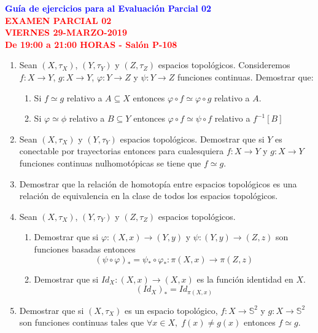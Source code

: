 \documentclass[12pt]{report}
\numberwithin{section}{chapter}
\newcommand{\s}{\mathbb S}
\begin{document}
\begin{center}
\textcolor{blue}{\textbf{\large Guía de ejercicios para al Evaluación Parcial 02}}\\
\vspace{0.5 cm}
\textcolor{red}{\textbf{\large EXAMEN PARCIAL 02 \\ VIERNES
29-MARZO-2019\\ De 19:00 a 21:00 HORAS - Salón P-108}}
\end{center}

\begin{enumerate}

\item Sean $(X,\tau_X)$, $(Y,\tau_Y)$ y $(Z, \tau_Z)$ espacios topológicos. Consideremos $f: X \to Y$, $g: X \to Y$, $\varphi: Y \to Z$ y $\psi: Y \to Z$ funciones continuas. Demostrar que:
\begin{enumerate}
\item Si $f \simeq g$ relativo a $A \subseteq X$ entonces $\varphi \circ f \simeq \varphi\circ g$ relativo a $A$.
\item Si $\varphi \simeq \phi$ relativo a $B\subseteq Y$ entonces $\varphi \circ f \simeq \psi \circ f$ relativo a $f^{-1}[B]$
\end{enumerate}

\item Sean $(X,\tau_X)$ y $(Y,\tau_Y)$ espacios topológicos. Demostrar que si $Y$ es conectable por trayectorias entonces para cualesquiera $f: X \to Y$ y $g : X\to Y$ funciones continuas nulhomotópicas se tiene que $f\simeq g$.

\item Demostrar que la relación de homotopía entre espacios topológicos es una relación de equivalencia en la clase de todos los espacios topológicos.

\item Sean $(X,\tau_X)$, $(Y,\tau_Y)$ y $(Z, \tau_Z)$ espacios topológicos.
\begin{enumerate}
\item Demostrar que si $\varphi: (X,x) \to (Y,y)$ y $\psi: (Y,y) \to (Z,z)$ son funciones basadas entonces
$$(\psi \circ \varphi)_* = \psi_*\circ \varphi_* : \pi(X,x)\to \pi(Z,z)$$

\item Demostrar que si $Id_X: (X,x)\to (X,x)$ es la función identidad en $X$.
$$(Id_X)_* = Id_{\pi(X,x)}$$
\end{enumerate}

\item Demostrar que si $(X, \tau_X)$ es un espacio topológico, $f : X \to \s^2$ y $g :X \to \s^2$ son funciones continuas tales que $\forall x\in X,\; f(x)\neq g(x)$ entonces $f\simeq g$.


\end{enumerate}
\end{document}
